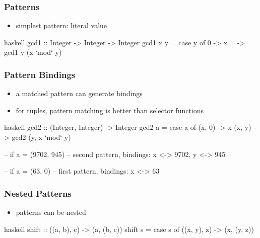 \documentclass[dvipsnames]{beamer}
\theoremstyle{plain}
\begin{document}
\begin{frame}[fragile]
  \frametitle{Patterns}

  \begin{itemize}
    \item simplest pattern: literal value
  \end{itemize}

  \begin{exampleblock}{}
    \begin{pygments}{haskell}
gcd1 :: Integer -> Integer -> Integer
gcd1 x y =
    case y of
      0 -> x
      _ -> gcd1 y (x `mod` y)
    \end{pygments}
  \end{exampleblock}
\end{frame}

\begin{frame}[fragile]
  \frametitle{Pattern Bindings}

  \begin{itemize}
    \item a matched pattern can generate bindings
    \item for tuples, pattern matching is better than selector functions
  \end{itemize}

  \begin{exampleblock}{}
    \begin{pygments}{haskell}
gcd2 :: (Integer, Integer) -> Integer
gcd2 a =
    case a of
      (x, 0) -> x
      (x, y) -> gcd2 (y, x `mod` y)

-- if a = (9702, 945)
-- second pattern, bindings: x <-> 9702, y <-> 945

-- if a = (63, 0)
-- first pattern, bindings: x <-> 63
    \end{pygments}
  \end{exampleblock}
\end{frame}

\begin{frame}[fragile]
  \frametitle{Nested Patterns}

  \begin{itemize}
    \item patterns can be nested
  \end{itemize}

  \begin{exampleblock}{}
    \begin{pygments}{haskell}
shift :: ((a, b), c) -> (a, (b, c))
shift s =
    case s of
      ((x, y), z) -> (x, (y, z))
    \end{pygments}
  \end{exampleblock}
\end{frame}
\end{document}

